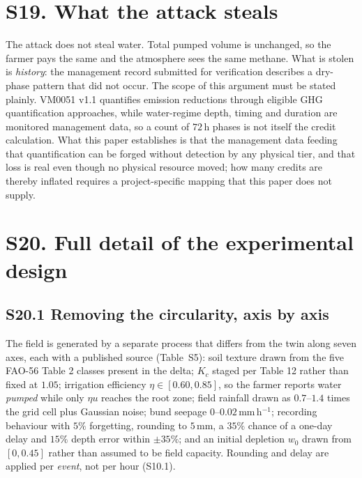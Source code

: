 \section*{S19. What the attack steals}

The attack does not steal water. Total pumped volume is unchanged, so the
farmer pays the same and the atmosphere sees the same methane. What is stolen is \emph{history}: the management record submitted for verification
describes a dry-phase pattern that did not occur. The scope of this argument must be
stated plainly. VM0051 v1.1 quantifies emission reductions through eligible GHG
quantification approaches, while water-regime depth, timing and duration are monitored
management data, so a count of $72$\,h phases is not itself the credit calculation.
What this paper establishes is that the management data feeding that quantification can
be forged without detection by any physical tier, and that loss is real even though no
physical resource moved; how many credits are thereby inflated requires a
project-specific mapping that this paper does not supply.

\section*{S20. Full detail of the experimental design}

\subsection*{S20.1 Removing the circularity, axis by axis}

The field is generated by a separate process that differs from the twin along
seven axes, each with a published source (Table~S5): soil texture drawn from
the five FAO-56 Table 2 classes present in the delta; $K_c$ staged per Table 12
rather than fixed at $1.05$; irrigation efficiency $\eta\in[0.60,0.85]$, so
the farmer reports water \emph{pumped} while only $\eta u$ reaches the root
zone; field rainfall drawn as $0.7$--$1.4$ times the grid cell plus Gaussian
noise; bund seepage $0$--$0.02$\,mm\,h$^{-1}$; recording behaviour with $5\%$
forgetting, rounding to $5$\,mm, a $35\%$ chance of a one-day delay and
$15\%$ depth error within $\pm35\%$; and an initial depletion $w_0$ drawn
from $[0,0.45]$ rather than assumed to be field capacity. Rounding and delay
are applied per \emph{event}, not per hour (S10.1).

